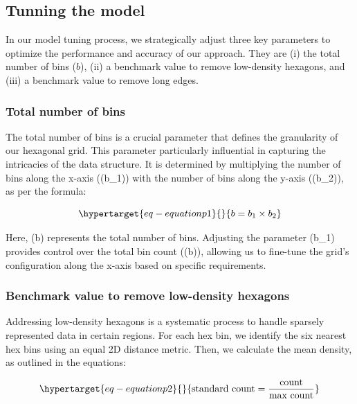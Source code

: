 \documentclass[
  12pt]{article}
\begin{document}
\hypertarget{tunning-the-model}{%
\subsection{Tunning the model}\label{tunning-the-model}}

In our model tuning process, we strategically adjust three key
parameters to optimize the performance and accuracy of our approach.
They are (i) the total number of bins (\(b\)), (ii) a benchmark value to
remove low-density hexagons, and (iii) a benchmark value to remove long
edges.

\hypertarget{total-number-of-bins}{%
\subsubsection{Total number of bins}\label{total-number-of-bins}}

The total number of bins is a crucial parameter that defines the
granularity of our hexagonal grid. This parameter particularly
influential in capturing the intricacies of the data structure. It is
determined by multiplying the number of bins along the x-axis ((b\_1))
with the number of bins along the y-axis ((b\_2)), as per the formula:

\begin{equation}\protect\hypertarget{eq-equationp1}{}{
b = b_1 \times b_2
}\label{eq-equationp1}\end{equation}

Here, (b) represents the total number of bins. Adjusting the parameter
(b\_1) provides control over the total bin count ((b)), allowing us to
fine-tune the grid's configuration along the x-axis based on specific
requirements.

\hypertarget{benchmark-value-to-remove-low-density-hexagons}{%
\subsubsection{Benchmark value to remove low-density
hexagons}\label{benchmark-value-to-remove-low-density-hexagons}}

Addressing low-density hexagons is a systematic process to handle
sparsely represented data in certain regions. For each hex bin, we
identify the six nearest hex bins using an equal 2D distance metric.
Then, we calculate the mean density, as outlined in the equations:

\begin{equation}\protect\hypertarget{eq-equationp2}{}{
\text{standard count} = \frac{\text{count}}{\text{max count}} 
}\label{eq-equationp2}\end{equation}
\end{document}
